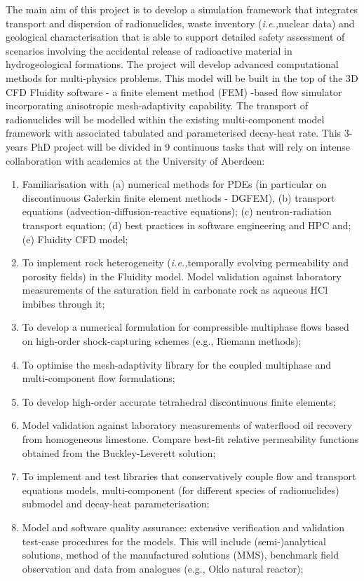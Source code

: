\documentclass[14pt,twoside]{report}
\newcommand{\ie}{{\it i.e.,}}
\begin{document}
The main aim of this project is to develop a simulation framework that integrates transport and dispersion of radionuclides, waste inventory (\ie nuclear data) and geological characterisation that is able to support detailed safety assessment of scenarios involving the accidental release of radioactive material in hydrogeological formations. The project will develop advanced computational methods for multi-physics problems. This model will be built in the top of the 3D CFD Fluidity software - a finite element method (FEM) -based flow simulator incorporating anisotropic mesh-adaptivity capability. The transport of radionuclides will be modelled within the existing multi-component model framework with associated tabulated and parameterised decay-heat rate. This 3-years PhD project will be divided in 9 continuous tasks that will rely on intense collaboration with academics at the University of Aberdeen:
\begin{enumerate}
   \item Familiarisation with (a) numerical methods for PDEs (in particular on discontinuous Galerkin finite element methods - DGFEM), (b) transport equations (advection-diffusion-reactive equations); (c) neutron-radiation transport equation; (d) best practices in software engineering and HPC and; (e) Fluidity CFD model;
   \item To implement rock heterogeneity (\ie temporally evolving permeability and porosity fields) in the Fluidity model. Model validation against laboratory measurements of the saturation field in carbonate rock as aqueous HCl imbibes through it;
   \item To develop a numerical formulation for compressible multiphase flows based on high-order shock-capturing schemes (e.g., Riemann methods);
   \item To optimise the mesh-adaptivity library for the coupled multiphase and multi-component flow formulations;
   \item To develop high-order accurate tetrahedral discontinuous finite elements;
   \item Model validation against laboratory measurements of waterflood oil recovery from homogeneous limestone. Compare best-fit relative permeability functions obtained from the Buckley-Leverett solution;
   \item To implement and test libraries that conservatively couple flow and transport equations models, multi-component (for different species of radionuclides) submodel and decay-heat parameterisation;
   \item Model and software quality assurance: extensive verification and validation test-case procedures for the models. This will include (semi-)analytical solutions, method of the manufactured solutions (MMS), benchmark field observation and data from analogues (e.g., Oklo natural reactor);
\end{enumerate}
\end{document}
